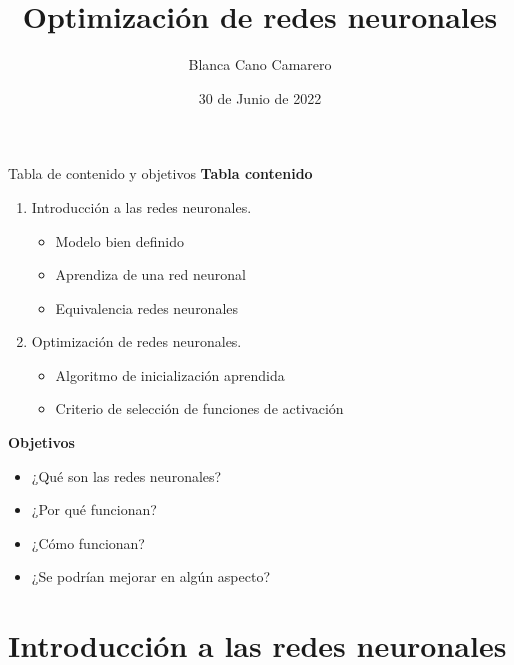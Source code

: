 \documentclass{beamer}
\title{Optimización de redes neuronales}
\author{Blanca Cano Camarero}
\date{30 de Junio de 2022}
\begin{document}
\begin{frame}
    \titlepage 
\end{frame}


\begin{frame}{Tabla de contenido y objetivos}
    \textbf{Tabla contenido}
    \begin{enumerate}
        \item Introducción a las redes neuronales.
        \begin{itemize}
            \item Modelo bien definido
            \item Aprendiza de una red neuronal
            \item Equivalencia redes neuronales
        \end{itemize}
        \item Optimización de redes neuronales.
        \begin{itemize}
            \item Algoritmo de inicialización aprendida
            \item Criterio de selección de funciones de activación
        \end{itemize}
    \end{enumerate}

    \textbf{Objetivos}
    \begin{itemize}
        \item ¿Qué son las redes neuronales?
        \item ¿Por qué funcionan?
        \item ¿Cómo funcionan?
        \item ¿Se podrían mejorar en algún aspecto?
    \end{itemize}
\end{frame}
\section{Introducción a las redes neuronales}
\end{document}
